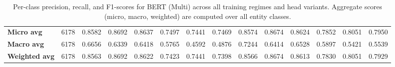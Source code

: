\documentclass[11pt,a4paper,twocolumn]{article}
\begin{document}
\begin{table}[t]
\begin{tabular}{l r ccc ccc ccc ccc}
\midrule
\textbf{Micro avg}    & 6178 & 0.8582 & 0.8692 & 0.8637 & 0.7497 & 0.7441 & 0.7469 & 0.8574 & 0.8674 & 0.8624 & 0.7852 & 0.8051 & 0.7950 \\
\textbf{Macro avg}    & 6178 & 0.6656 & 0.6339 & 0.6418 & 0.5765 & 0.4592 & 0.4876 & 0.7244 & 0.6414 & 0.6528 & 0.5897 & 0.5421 & 0.5539 \\
\textbf{Weighted avg} & 6178 & 0.8563 & 0.8692 & 0.8622 & 0.7423 & 0.7441 & 0.7398 & 0.8566 & 0.8674 & 0.8613 & 0.7830 & 0.8051 & 0.7929 \\
\bottomrule
\end{tabular}
\caption{Per-class precision, recall, and F1-scores for BERT (Multi) across all training regimes and head variants. Aggregate scores (micro, macro, weighted) are computed over all entity classes.}
\label{tab:appendix-bert-multi-classification}
\end{table}
\end{document}
